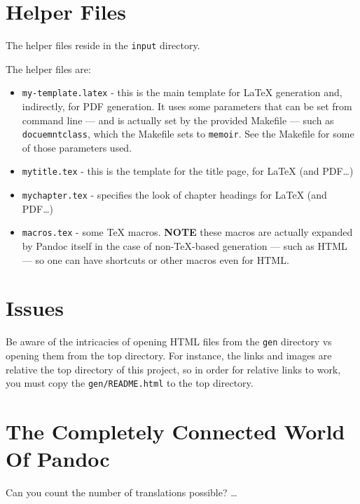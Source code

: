 \documentclass[oneside,]{memoir}
\begin{document}
\section{Helper Files}

The helper files reside in the \texttt{input} directory.

The helper files are:

\begin{itemize}
\item
  \texttt{my-template.latex} - this is the main template for LaTeX
  generation and, indirectly, for PDF generation. It uses some
  parameters that can be set from command line --- and is actually set
  by the provided Makefile --- such as \texttt{docuemntclass}, which the
  Makefile sets to \texttt{memoir}. See the Makefile for some of those
  parameters used.
\item
  \texttt{mytitle.tex} - this is the template for the title page, for
  LaTeX (and PDF\ldots{})
\item
  \texttt{mychapter.tex} - specifies the look of chapter headings for
  LaTeX (and PDF\ldots{})
\item
  \texttt{macros.tex} - some TeX macros. \textbf{NOTE} these macros are
  actually expanded by Pandoc itself in the case of non-TeX-based
  generation --- such as HTML --- so one can have shortcuts or other
  macros even for HTML.
\end{itemize}
\section{Issues}

Be aware of the intricacies of opening HTML files from the \texttt{gen}
directory vs opening them from the top directory. For instance, the
links and images are relative the top directory of this project, so in
order for relative links to work, you must copy the
\texttt{gen/README.html} to the top directory.

\section{The Completely Connected World Of Pandoc}

Can you count the number of translations possible? \ldots{}
\end{document}
